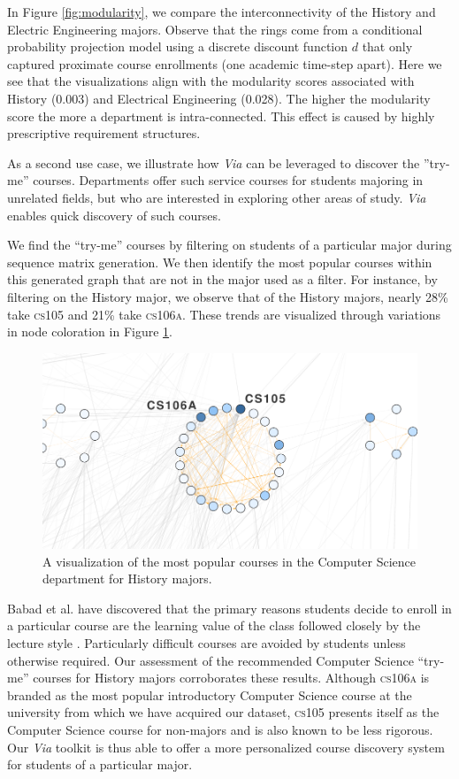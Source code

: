 \documentclass{sigchi}
\begin{document}
In Figure \ref{fig:modularity}, we compare the interconnectivity of
the History and Electric Engineering majors.  Observe that the rings
come from a conditional probability projection model using a discrete
discount function $d$ that only captured proximate course enrollments
(one academic time-step apart). Here we see that the visualizations
align with the modularity scores associated with History (0.003) and
Electrical Engineering (0.028). The higher the modularity score the
more a department is intra-connected. This effect is caused by highly
prescriptive requirement structures.

As a second use case, we illustrate how \textit{Via} can be leveraged
to discover the ''try-me'' courses. Departments offer such service courses for students
majoring in unrelated fields, but who are interested in exploring other
areas of study. {\em Via} enables quick discovery of such courses.

We find the ``try-me'' courses by filtering on students of a
particular major during sequence matrix generation. We then identify
the most popular courses within this generated graph that are not in
the major used as a filter. For instance, by filtering on the History
major, we observe that of the History majors, nearly 28\% take \textsc{cs105}
and 21\% take \textsc{cs106a}. These trends are visualized through variations
in node coloration in Figure \ref{fig:history-try-me}.

\begin{figure}[h]
    \centering
    \includegraphics[width=.9\columnwidth]{Figs/final-history-try-me.pdf}
    \caption{A visualization of the most popular courses in the Computer Science department for History majors.}
    \label{fig:history-try-me}
\end{figure}

 Babad et al. have discovered that the primary reasons students decide to enroll in a particular course are the learning value of the class followed closely by the lecture style \cite{Babad2003}. Particularly difficult courses are avoided by students unless otherwise required. Our assessment of the recommended Computer Science ``try-me'' courses for History majors corroborates these results. Although \textsc{cs106a} is branded as the most popular introductory Computer Science course at the university from which we have acquired our dataset, \textsc{cs105} presents itself as the Computer Science course for non-majors and is also known to be less rigorous. Our \textit{Via} toolkit is thus able to offer a more personalized course discovery system for students of a particular major. 
 
\end{document}
